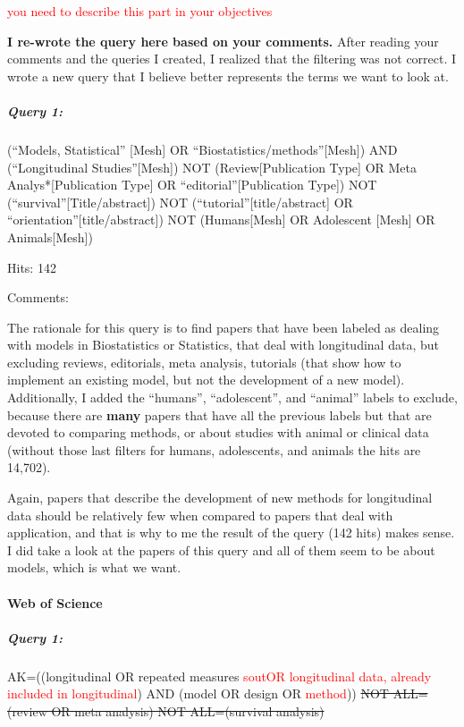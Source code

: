 \documentclass[
]{article}
\let\oldparagraph\paragraph
\renewcommand{\paragraph}[1]{\oldparagraph{#1}\mbox{}}
\let\oldsubparagraph\subparagraph
\renewcommand{\subparagraph}[1]{\oldsubparagraph{#1}\mbox{}}
\newcommand{\BN}[1]{\textcolor{red}{#1}}
\begin{document}
\BN{you need to describe this part in your objectives}

\textbf{I re-wrote the query here based on your comments.} After reading
your comments and the queries I created, I realized that the filtering
was not correct. I wrote a new query that I believe better represents
the terms we want to look at.

\hypertarget{query-1-1}{%
\subparagraph{Query 1:}\label{query-1-1}}

(``Models, Statistical'' {[}Mesh{]} OR
``Biostatistics/methods''{[}Mesh{]}) AND (``Longitudinal
Studies''{[}Mesh{]}) NOT (Review{[}Publication Type{]} OR Meta
Analys*{[}Publication Type{]} OR ``editorial''{[}Publication Type{]})
NOT (``survival''{[}Title/abstract{]}) NOT
(``tutorial''{[}title/abstract{]} OR
``orientation''{[}title/abstract{]}) NOT (Humans{[}Mesh{]} OR Adolescent
{[}Mesh{]} OR Animals{[}Mesh{]})

Hits: 142

Comments:

The rationale for this query is to find papers that have been labeled as
dealing with models in Biostatistics or Statistics, that deal with
longitudinal data, but excluding reviews, editorials, meta analysis,
tutorials (that show how to implement an existing model, but not the
development of a new model). Additionally, I added the ``humans'',
``adolescent'', and ``animal'' labels to exclude, because there are
\textbf{many} papers that have all the previous labels but that are
devoted to comparing methods, or about studies with animal or clinical
data (without those last filters for humans, adolescents, and animals
the hits are 14,702).

Again, papers that describe the development of new methods for
longitudinal data should be relatively few when compared to papers that
deal with application, and that is why to me the result of the query
(142 hits) makes sense. I did take a look at the papers of this query
and all of them seem to be about models, which is what we want.

\hypertarget{web-of-science-1}{%
\paragraph{Web of Science}\label{web-of-science-1}}

\hypertarget{query-1-2}{%
\subparagraph{Query 1:}\label{query-1-2}}

AK=((longitudinal OR repeated measures
\BN{sout{OR longitudinal data, already included in longitudinal}}) AND
(model OR design OR \BN{method}))
\sout{NOT ALL=(review OR meta analysis) NOT ALL=(survival
analysis)}
\end{document}
